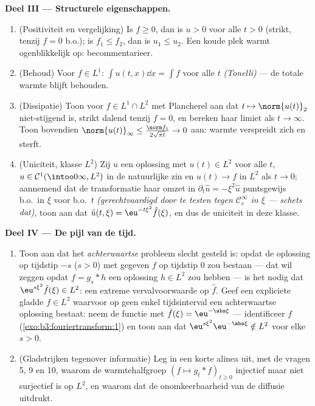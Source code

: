 \begin{problem}[{Weekendopgave --- $\partial_tu =
\partial^2_{xx}u$, van begin tot eind opgelost}]
\medskip
\noindent\textbf{Deel III --- Structurele eigenschappen.}
\begin{enumerate}[resume]
  \item (Positiviteit en vergelijking) Is $f \geq 0$, dan is $u >
        0$ voor alle $t > 0$ (strikt, tenzij $f = 0$ b.o.); is
        $f_1 \leq f_2$, dan is $u_1 \leq u_2$. Een koude plek
        warmt ogenblikkelijk op: becommentarieer.
  \item (Behoud) Voor $f \in L^1$: $\int u(t, x)\dd x = \int f$
        voor alle $t$ \emph{(Tonelli)} --- de totale warmte
        blijft behouden.
  \item (Dissipatie) Toon voor $f \in L^1\cap L^2$ met Plancherel
        aan dat $t \mapsto \norm{u(t)}_2$ niet-stijgend is,
        strikt dalend tenzij $f = 0$, en bereken haar limiet als
        $t \to \infty$. Toon bovendien $\norm{u(t)}_\infty \leq
        \frac{\norm f_1}{2\sqrt{\pi t}} \to 0$ aan: warmte
        verspreidt zich en sterft.
  \item (Uniciteit, klasse $L^2$) Zij $u$ een oplossing met $u(t)
        \in L^2$ voor alle $t$, $u \in \mathcal
        C^1(\intoo0\infty, L^2)$ in de natuurlijke zin en $u(t)
        \to f$ in $L^2$ als $t\to0$; aannemend dat de
        transformatie haar omzet in $\partial_t\hat u =
        -\xi^2\hat u$ puntsgewijs b.o.\ in $\xi$ voor b.o.\ $t$
        \emph{(gerechtvaardigd door te testen tegen $\mathcal
        C_c^\infty$ in $\xi$ --- schets dat)}, toon aan dat $\hat
        u(t,\xi) = \eu^{-t\xi^2}\hat f(\xi)$, en dus de uniciteit
        in deze klasse.
\end{enumerate}

\medskip
\noindent\textbf{Deel IV --- De pijl van de tijd.}
\begin{enumerate}[resume]
  \item Toon aan dat het \emph{achterwaartse} probleem slecht
        gesteld is: opdat de oplossing op tijdstip $-s$ ($s > 0$)
        met gegeven $f$ op tijdstip $0$ zou bestaan --- dat wil
        zeggen opdat $f = g_s * h$ een oplossing $h \in L^2$ zou
        hebben --- is het nodig dat $\eu^{s\xi^2}\hat f(\xi) \in
        L^2$: een extreme vervalvoorwaarde op $\hat f$. Geef een
        expliciete gladde $f \in L^2$ waarvoor op geen enkel
        tijdsinterval een achterwaartse oplossing bestaat: neem
        de functie met $\hat f(\xi) = \eu^{-\abs\xi}$ ---
        identificeer $f$ (\cref{exo:b3:fouriertransform:1}) en
        toon aan dat $\eu^{s\xi^2}\eu^{-\abs\xi} \notin L^2$ voor
        elke $s > 0$.
  \item (Gladstrijken tegenover informatie) Leg in een korte
        alinea uit, met de vragen 5, 9 en 10, waarom de
        warmtehalfgroep $(f \mapsto g_t * f)_{t\geq0}$ injectief
        maar niet surjectief is op $L^2$, en waarom dat de
        onomkeerbaarheid van de diffusie uitdrukt.
\end{enumerate}


\end{problem}
